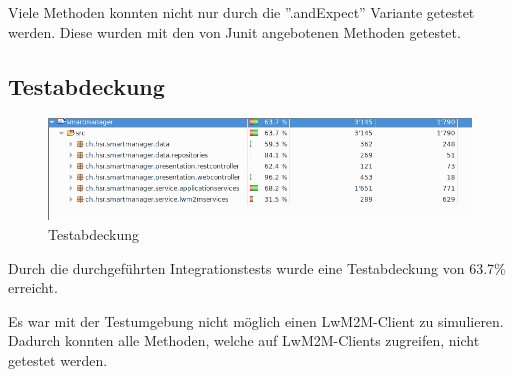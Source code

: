 Viele Methoden konnten nicht nur durch die ''.andExpect'' Variante getestet werden. Diese wurden mit den von Junit angebotenen Methoden getestet.
\subsection{Testabdeckung}
\begin{figure}[H]
\centering
\includegraphics[scale=0.5]{../04_Realisierung/images/testcoverage.png}
\caption{Testabdeckung}
\end{figure}

Durch die durchgeführten Integrationstests wurde eine Testabdeckung von 63.7\% erreicht. 

Es war mit der Testumgebung nicht möglich einen LwM2M-Client zu simulieren. Dadurch konnten alle Methoden, welche auf LwM2M-Clients zugreifen, nicht getestet werden.